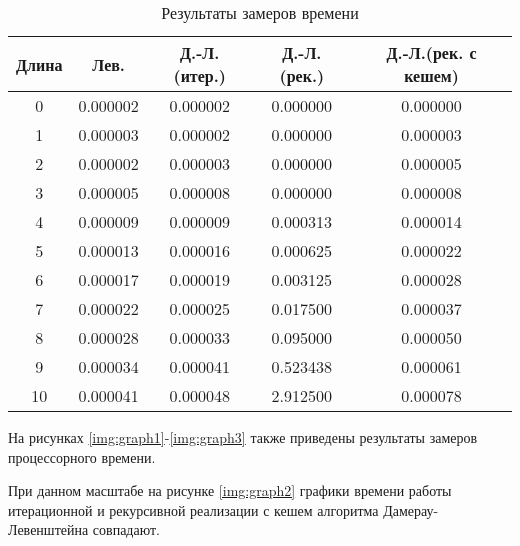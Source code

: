 \begin{table}[h]
    \begin{center}
        \begin{threeparttable}
        \captionsetup{justification=raggedright,singlelinecheck=off}
        \caption{\label{tbl:time_res}Результаты замеров времени}
        \begin{tabular}{|c|c|c|c|c|}
            \hline
            Длина &Лев.&Д.-Л.(итер.)&Д.-Л.(рек.)&Д.-Л.(рек. с кешем)\\
            \hline
            0 & 0.000002 & 0.000002 & 0.000000 & 0.000000 \\ 
            \hline
            1 & 0.000003 & 0.000002 & 0.000000 & 0.000003 \\ 
            \hline
            2 & 0.000002 & 0.000003 & 0.000000 & 0.000005 \\ 
            \hline
            3 & 0.000005 & 0.000008 & 0.000000 & 0.000008 \\ 
            \hline
            4 & 0.000009 & 0.000009 & 0.000313 & 0.000014 \\ 
            \hline
            5 & 0.000013 & 0.000016 & 0.000625 & 0.000022 \\ 
            \hline
            6 & 0.000017 & 0.000019 & 0.003125 & 0.000028 \\ 
            \hline
            7 & 0.000022 & 0.000025 & 0.017500 & 0.000037 \\ 
            \hline
            8 & 0.000028 & 0.000033 & 0.095000 & 0.000050 \\ 
            \hline
            9 & 0.000034 & 0.000041 & 0.523438 & 0.000061 \\ 
            \hline
            10 & 0.000041 & 0.000048 & 2.912500 & 0.000078 \\ 
            \hline
		\end{tabular}
    \end{threeparttable}
\end{center}
\end{table}

На рисунках \ref{img:graph1}-\ref{img:graph3} также приведены результаты замеров процессорного времени. 

При данном масштабе на рисунке \ref{img:graph2} графики времени работы итерационной и рекурсивной реализации с кешем алгоритма Дамерау-Левенштейна совпадают.

\FloatBarrier
{}
\FloatBarrier
{}
\FloatBarrier


